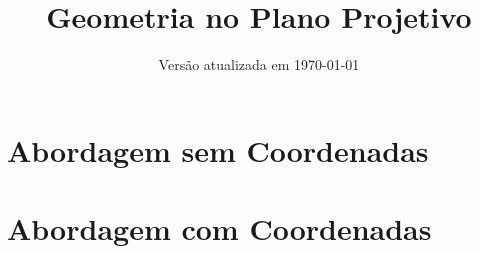 \documentclass{scrbook}
\title{Geometria no Plano Projetivo}
\author{}
\date{Versão atualizada em \today}
\theoremstyle{definition}
\theoremstyle{remark}
\begin{document}
	\maketitle

	\tableofcontents

	

	\part{Abordagem sem Coordenadas}


	\part{Abordagem com Coordenadas}

	
	
	

	\printbibliography
\end{document}

